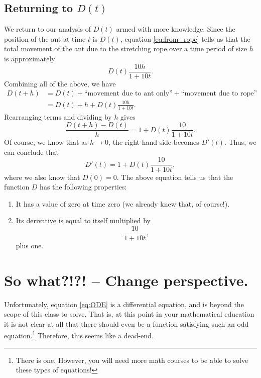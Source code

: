\subsection{Returning to $D(t)$}
We return to our analysis of $D(t)$ armed with more knowledge.  Since
the position of the ant at time $t$ is $D(t)$, equation
\eqref{eq:from_rope} tells us that the total movement of the ant due
to the stretching rope over a time period of size $h$ is approximately
\[
D(t) \frac{10h}{1 + 10 t}.
\]
Combining all of the above, we have
\begin{align*}
  D(t + h) &= D(t) + \text{``movement due to ant only''} + \text{``movement due to rope''}\\
  &= D(t) + h + D(t) \frac{10h}{1 + 10 t}.
\end{align*}
Rearranging terms and dividing by $h$ gives
\[
\frac{D(t+h) - D(t)}{h} = 1 + D(t) \frac{10}{1 + 10 t}.
\]
Of course, we know that as $h \to 0$, the right hand side becomes
$D'(t)$.  Thus, we can conclude that
\begin{equation}\label{eq:ODE}
  D'(t) = 1 + D(t) \frac{10}{1 + 10t},
\end{equation}
where we also know that $D(0) = 0$.  The above equation tells us that
the function $D$ has the following properties:
\begin{enumerate}
\item It has a value of zero at time zero (we already knew that, of
  course!).
\item Its derivative is equal to itself multiplied by
  \[
  \frac{10}{1 + 10t},
  \]
  plus one.
\end{enumerate}

\section{So what?!?! -- Change perspective.}
Unfortunately, equation \eqref{eq:ODE} is a differential equation, and
is beyond the scope of this class to solve.  That is, at this point in
your mathematical education it is not clear at all that there should
even be a function satisfying such an odd equation.\footnote{There is
  one.  However, you will need more math courses to be able to solve
  these types of equations!}  Therefore, this seems like a dead-end.
%
%

